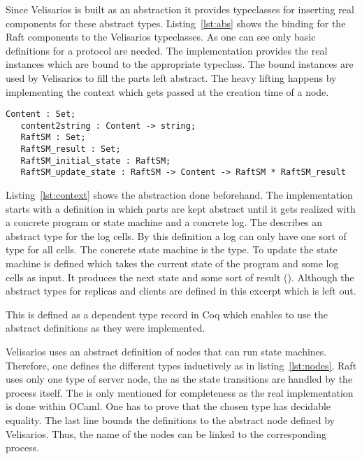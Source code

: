 Since Velisarios is built as an abstraction it provides typeclasses
for inserting real components for these abstract types. Listing~\ref{lst:abs}
shows the binding for the Raft components to the Velisarios typeclasses.
As one can see only basic definitions for a protocol are needed.
The implementation provides the real instances which are bound to
the appropriate typeclass. The bound instances are used by Velisarios
to fill the parts left abstract. The heavy lifting happens by 
implementing the context which gets passed at the creation time of a node.

\begin{lstlisting}[style=coq,label=lst:context,
caption=Excerpt of the context definition of types and functions used within
the protocol.]
   Content : Set;
   content2string : Content -> string;
   RaftSM : Set;
   RaftSM_result : Set;
   RaftSM_initial_state : RaftSM;
   RaftSM_update_state : RaftSM -> Content -> RaftSM * RaftSM_result
\end{lstlisting}

Listing~\ref{lst:context} shows the abstraction done beforehand. The
implementation starts with a definition in which parts are kept abstract
until it gets realized with a concrete program or state machine and
a concrete log. The  describes an abstract type for the log
cells. By this definition a log can only have one sort of type for all cells.
The concrete state machine is the  type. To update the state
machine  is defined which takes the current
state of the program and some log cells as input. It produces the next
state and some sort of result (). Although the abstract
types for replicas and clients are defined in this excerpt which is left out. 

This is defined as a dependent type record in Coq which enables to use the
abstract definitions as they were implemented. 

Velisarios uses an abstract definition of nodes that can run state machines.
Therefore, one defines the different types inductively as in
listing~\ref{lst:nodes}. Raft uses only one type of server node, the
 as the state transitions are handled by the process itself.
The  is only mentioned for completeness as the real implementation
is done within OCaml. One has to prove that the chosen type has decidable
equality. The last line bounds the definitions to the abstract node defined
by Velisarios. Thus, the name of the nodes can be linked to the corresponding
process. 

